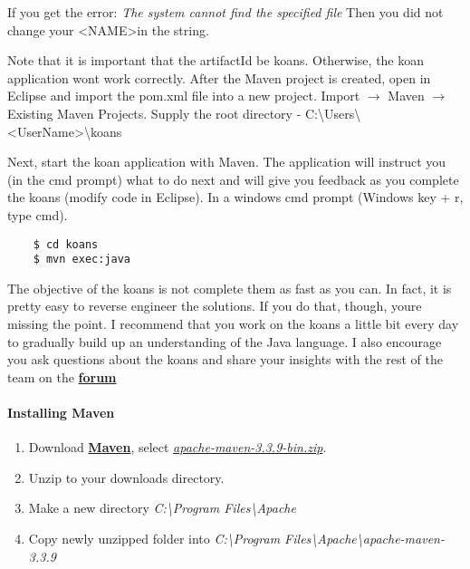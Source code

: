 \documentclass[12pt]{article}
\begin{document}
If you get the error: \textit{The system cannot find the specified file} Then you did not change your \textless NAME\textgreater in the string.

Note that it is important that the artifactId be koans. Otherwise, the koan application wont work correctly. After the Maven project is created, open in Eclipse and import the pom.xml file into a new project. Import $\rightarrow$ Maven $\rightarrow$ Existing Maven Projects. Supply the root directory - C:\textbackslash Users\textbackslash \textless UserName\textgreater \textbackslash koans



Next, start the koan application with Maven. The application will instruct you (in the cmd prompt) what to do next and will give you feedback as you complete the koans (modify code in Eclipse). In a windows cmd prompt (Windows key + r, type cmd).

\begin{verbatim}
    $ cd koans
    $ mvn exec:java
\end{verbatim}

The objective of the koans is not complete them as fast as you can. In fact, it is pretty easy to reverse engineer the solutions. If you do that, though, youre missing the point. I recommend that you work on the koans a little bit every day to gradually build up an understanding of the Java language. I also encourage you ask questions about the koans and share your insights with the rest of the team on the \textbf{\href{http://glencoerobotics.com/forum/viewforum.php?f=8}{forum}}

\paragraph{Installing Maven} \mbox{} 

\begin{enumerate}

\item Download \textbf{\href{http://maven.apache.org/download.cgi}{Maven}}, select \textit{\href{http://shinyfeather.com/maven/maven-3/3.3.9/binaries/apache-maven-3.3.9-bin.zip}{apache-maven-3.3.9-bin.zip}}.
\item Unzip to your downloads directory.
\item Make a new directory \textit{C:\textbackslash Program Files\textbackslash Apache}
\item Copy newly unzipped folder into \textit{C:\textbackslash Program Files\textbackslash Apache\textbackslash apache-maven-3.3.9}
\end{enumerate}
\end{document}
